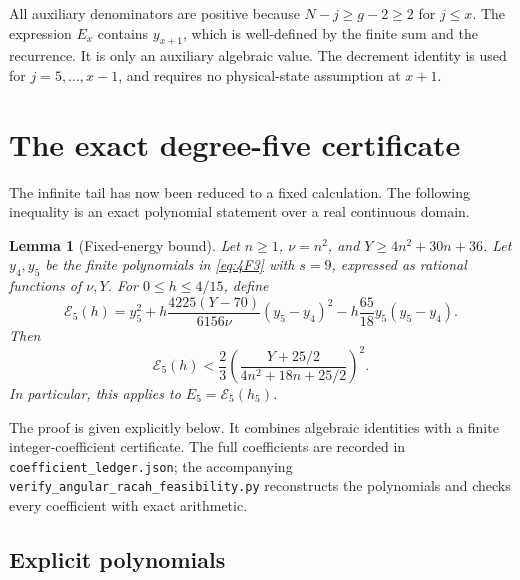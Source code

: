 \documentclass[11pt]{article}
\newtheorem{lemma}[theorem]{Lemma}
\theoremstyle{remark}
\numberwithin{equation}{section}
\begin{document}
All auxiliary denominators are positive because $N-j\ge g-2\ge2$ for
$j\le x$. The expression $E_x$ contains $y_{x+1}$, which is well-defined
by the finite sum and the recurrence. It is only an auxiliary algebraic
value. The decrement identity is used for $j=5,\ldots,x-1$, and requires
no physical-state assumption at $x+1$.

\section{The exact degree-five certificate}
\label{sec:certificate}

The infinite tail has now been reduced to a fixed calculation. The following
inequality is an exact polynomial statement over a real continuous domain.

\begin{lemma}[Fixed-energy bound]
\label{lem:E5}
Let $n\ge1$, $\nu=n^2$, and $Y\ge4n^2+30n+36$. Let $y_4,y_5$ be
the finite polynomials in \eqref{eq:4F3} with $s=9$, expressed as rational
functions of $\nu,Y$. For $0\le h\le4/15$, define
\begin{equation}
 \mathcal E_5(h)=y_5^2
 +h\frac{4225(Y-70)}{6156\nu}(y_5-y_4)^2
 -h\frac{65}{18}y_5(y_5-y_4).
 \label{eq:E5direct}
\end{equation}
Then
\begin{equation}
 \mathcal E_5(h)
 <\frac23\left(\frac{Y+25/2}{4n^2+18n+25/2}\right)^2.
 \label{eq:E5certificate}
\end{equation}
In particular, this applies to $E_5=\mathcal E_5(h_5)$.
\end{lemma}

The proof is given explicitly below. It combines algebraic identities with
a finite integer-coefficient certificate. The full coefficients are recorded
in \texttt{coefficient\_ledger.json}; the accompanying
\texttt{verify\_angular\_racah\_feasibility.py} reconstructs the polynomials
and checks every coefficient with exact arithmetic.

\subsection{Explicit polynomials}
\end{document}
